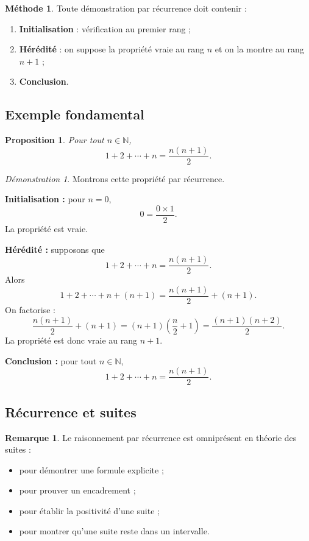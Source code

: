 \documentclass[11pt,a4paper]{article}
\theoremstyle{definition}
\newtheorem{remarque}[definition]{Remarque}
\newtheorem{methode}[definition]{Méthode}
\theoremstyle{plain}
\newtheorem{proposition}[definition]{Proposition}
\theoremstyle{remark}
\newtheorem*{demonstrationlibre}{Démonstration}
\newcommand{\N}{\mathbb{N}}
\begin{document}
\begin{methode}
Toute démonstration par récurrence doit contenir :
\begin{enumerate}[label=\arabic*.]
    \item \textbf{Initialisation} : vérification au premier rang ;
    \item \textbf{Hérédité} : on suppose la propriété vraie au rang $n$ et on la montre au rang $n+1$ ;
    \item \textbf{Conclusion}.
\end{enumerate}
\end{methode}

\subsection{Exemple fondamental}

\begin{proposition}
Pour tout $n\in\N$,
\[
1+2+\cdots+n=\frac{n(n+1)}2.
\]
\end{proposition}

\begin{demonstrationlibre}
Montrons cette propriété par récurrence.

\textbf{Initialisation :} pour $n=0$,
\[
0=\frac{0\times1}{2}.
\]
La propriété est vraie.

\textbf{Hérédité :} supposons que
\[
1+2+\cdots+n=\frac{n(n+1)}2.
\]
Alors
\[
1+2+\cdots+n+(n+1)=\frac{n(n+1)}2+(n+1).
\]
On factorise :
\[
\frac{n(n+1)}2+(n+1)=(n+1)\left(\frac n2+1\right)=\frac{(n+1)(n+2)}2.
\]
La propriété est donc vraie au rang $n+1$.

\textbf{Conclusion :} pour tout $n\in\N$,
\[
1+2+\cdots+n=\frac{n(n+1)}2.
\]
\end{demonstrationlibre}

\subsection{Récurrence et suites}

\begin{remarque}
Le raisonnement par récurrence est omniprésent en théorie des suites :
\begin{itemize}[leftmargin=0.8cm]
    \item pour démontrer une formule explicite ;
    \item pour prouver un encadrement ;
    \item pour établir la positivité d'une suite ;
    \item pour montrer qu'une suite reste dans un intervalle.
\end{itemize}
\end{remarque}
\end{document}
